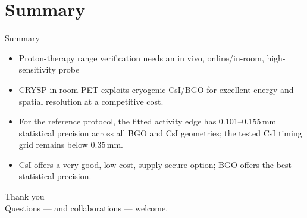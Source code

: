 \documentclass[aspectratio=169,11pt]{beamer}
\newcommand{\hi}[1]{\textcolor{crRed}{#1}}
\begin{document}
\section{Summary}

\begin{frame}{Summary}
  \begin{itemize}
    \item Proton-therapy range verification needs an \hi{in vivo}, online/in-room,
      high-sensitivity probe 
    \item \hi{CRYSP in-room PET} exploits cryogenic CsI/BGO for excellent energy
      and spatial resolution at a \hi{competitive cost}.
    \item For the reference protocol, the fitted activity edge has
      \hi{0.101--0.155\,mm statistical precision} across all BGO and CsI
      geometries; the tested CsI timing grid remains below 0.35\,mm.
    \item CsI offers a very good, low-cost, supply-secure option; BGO offers
      the best statistical precision.
  \end{itemize}
  \vspace{3mm}
\end{frame}

{
\begin{frame}[plain]
  \centering
  {\color{crBlue}\Large Thank you}\\[3mm]
  {\color{crGrey} Questions --- and collaborations --- welcome.}
\end{frame}}
\end{document}

